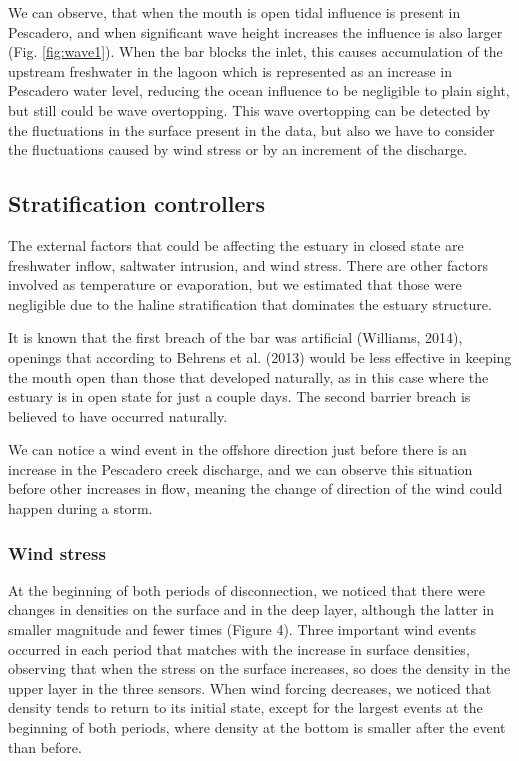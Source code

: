 \documentclass[11pt,letterpaper]{article}
\begin{document}
We can observe, that when the mouth is open tidal influence is present in Pescadero, and when significant wave height increases the influence is also larger (Fig. \ref{fig:wave1}). When the bar blocks the inlet, this causes accumulation of the upstream freshwater in the lagoon which is represented as an increase in Pescadero water level, reducing the ocean influence to be negligible to plain sight, but still could be wave overtopping. This wave overtopping can be detected by the fluctuations in the surface present in the data, but also we have to consider the fluctuations caused by wind stress or by an increment of the discharge.\\

\subsection{Stratification controllers}

The external factors that could be affecting the estuary in closed state are freshwater inflow, saltwater intrusion, and wind stress. There are other factors involved as temperature or evaporation, but we estimated that those were negligible due to the haline stratification that dominates the estuary structure.

It is known that the first breach of the bar was artificial (Williams, 2014), openings that according to Behrens et al. (2013) would be less effective in keeping the mouth open than those that developed naturally, as in this case where the estuary is in open state for just a couple days. The second barrier breach is believed to have occurred naturally. 

We can notice a wind event in the offshore direction just before there is an increase in the Pescadero creek discharge, and we can observe this situation before other increases in flow, meaning the change of direction of the wind could happen during a storm.

\subsubsection{Wind stress}

At the beginning of both periods of disconnection, we noticed that there were changes in densities on the surface and in the deep layer, although the latter in smaller magnitude and fewer times (Figure 4). Three important wind events occurred in each period that matches with the increase in surface densities, observing that when the stress on the surface increases, so does the density in the upper layer in the three sensors. When wind forcing decreases, we noticed that density tends to return to its initial state, except for the largest events at the beginning of both periods, where density at the bottom is smaller after the event than before.
\end{document}
